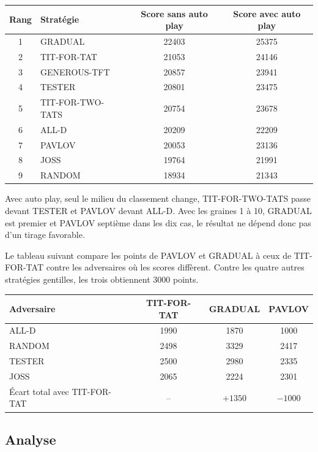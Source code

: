 \documentclass[11pt,a4paper]{article}
\begin{document}
\begin{center}
\begin{tabular}{clcc}
\toprule
Rang & Stratégie & Score sans auto play & Score avec auto play \\
\midrule
1 & GRADUAL & 22403 & 25375 \\
2 & TIT-FOR-TAT & 21053 & 24146 \\
3 & GENEROUS-TFT & 20857 & 23941 \\
4 & TESTER & 20801 & 23475 \\
5 & TIT-FOR-TWO-TATS & 20754 & 23678 \\
6 & ALL-D & 20209 & 22209 \\
7 & PAVLOV & 20053 & 23136 \\
8 & JOSS & 19764 & 21991 \\
9 & RANDOM & 18934 & 21343 \\
\bottomrule
\end{tabular}
\end{center}

Avec auto play, seul le milieu du classement change, TIT-FOR-TWO-TATS passe devant TESTER et PAVLOV devant ALL-D. Avec les
graines 1 à 10, GRADUAL est premier et PAVLOV septième dans les dix cas, le résultat ne dépend donc pas d'un tirage favorable.

Le tableau suivant compare les points de PAVLOV et GRADUAL à ceux de TIT-FOR-TAT contre les adversaires où les scores
diffèrent. Contre les quatre autres stratégies gentilles, les trois obtiennent 3000 points.

\begin{center}
\begin{tabular}{lccc}
\toprule
Adversaire & TIT-FOR-TAT & GRADUAL & PAVLOV \\
\midrule
ALL-D & 1990 & 1870 & 1000 \\
RANDOM & 2498 & 3329 & 2417 \\
TESTER & 2500 & 2980 & 2335 \\
JOSS & 2065 & 2224 & 2301 \\
\midrule
Écart total avec TIT-FOR-TAT & -- & $+1350$ & $-1000$ \\
\bottomrule
\end{tabular}
\end{center}

\subsection{Analyse}
\end{document}
